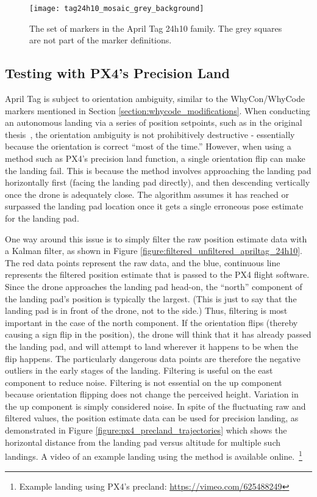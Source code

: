 \begin{figure}
    \centering
    \texttt{[image: tag24h10\_mosaic\_grey\_background]}
    \caption{The set of markers in the April Tag 24h10 family. The grey squares are not part of the marker definitions.}
    \label{figure:apriltag24h10}
\end{figure}

\subsection{Testing with PX4's Precision Land}

April Tag is subject to orientation ambiguity, similar to the WhyCon/WhyCode markers mentioned in Section \ref{section:whycode_modifications}.
When conducting an autonomous landing via a series of position setpoints, such as in the original thesis~\cite{joshua_master_thesis},
the orientation ambiguity is not prohibitively destructive - essentially because the orientation is correct ``most of the time.''
However, when using a method such as PX4's precision land function, a single orientation flip can make the landing fail.
This is because the method involves approaching the landing pad horizontally first (facing the landing pad directly),
and then descending vertically once the drone is adequately close.
The algorithm assumes it has reached or surpassed the landing pad location once it gets a single erroneous pose estimate for the landing pad.

One way around this issue is to simply filter the raw position estimate data with a Kalman filter, as shown in Figure \ref{figure:filtered_unfiltered_apriltag_24h10}.
The red data points represent the raw data, and the blue, continuous line represents the filtered position estimate
that is passed to the PX4 flight software.
Since the drone approaches the landing pad head-on, the ``north'' component of the landing pad's position is typically
the largest.
(This is just to say that the landing pad is in front of the drone, not to the side.)
Thus, filtering is most important in the case of the north component.
If the orientation flips (thereby causing a sign flip in the position),
the drone will think that it has already passed the landing pad, and will attempt to land wherever it happens to be
when the flip happens.
The particularly dangerous data points are therefore the negative outliers in the early stages of the landing.
Filtering is useful on the east component to reduce noise.
Filtering is not essential on the up component because orientation flipping does not change the perceived height.
Variation in the up component is simply considered noise.
In spite of the fluctuating raw and filtered values, the position estimate data can be used for precision landing,
as demonstrated in Figure \ref{figure:px4_precland_trajectories} which shows the horizontal distance from the landing pad versus altitude for multiple such landings.
A video of an example landing using the method is available online.~\footnote{Example landing using PX4's precland: \url{https://vimeo.com/625488249}}

